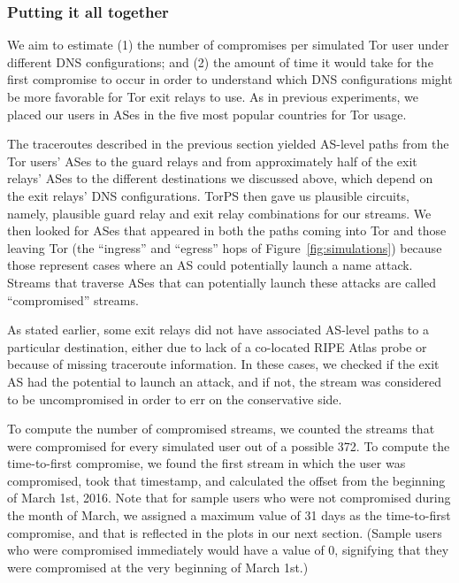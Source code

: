\subsubsection{Putting it all together}
We aim to estimate (1) the number of compromises per simulated 
Tor user under different DNS configurations; and (2) the amount of 
time it would take for the first compromise to occur 
in order to understand which DNS configurations 
might be more favorable for Tor exit relays to use. As in previous 
experiments, we placed our users in ASes in the five most popular 
countries for Tor usage.

The traceroutes described in the previous section yielded AS-level paths from 
the Tor users' ASes to the guard relays and from approximately half of the exit 
relays' ASes to the different destinations we discussed above, which depend on the exit  
relays' DNS configurations. TorPS then gave us plausible 
circuits, namely, plausible guard relay and exit relay combinations for our 
streams. We then looked for ASes that appeared in both the paths coming into Tor and those 
leaving Tor (the ``ingress'' and ``egress'' hops of Figure~\ref{fig:simulations}) 
because those represent cases where an AS could potentially launch a name attack. 
Streams that traverse ASes that can potentially launch these attacks are called 
``compromised'' streams.

As stated earlier, some exit relays did not have associated AS-level paths to a particular 
destination, either due to lack of a co-located RIPE Atlas probe or because of missing 
traceroute information. In these cases, we checked if the exit AS had the potential 
to launch an attack, and if not, the stream was considered to be uncompromised in order to 
err on the conservative side. 

To compute the number of compromised streams, we counted the streams that were compromised 
for every simulated user out of a possible 372. To compute the time-to-first compromise, 
we found the first stream in which the user was compromised, took that timestamp, and 
calculated the offset from the beginning of March 1st, 2016. Note that for sample users 
who were not compromised during the month of March, we assigned a maximum value 
of 31 days as the time-to-first compromise, and that is reflected in the plots in our 
next section. (Sample users who were compromised immediately would have a value of 0, 
signifying that they were compromised at the very beginning of March 1st.)

